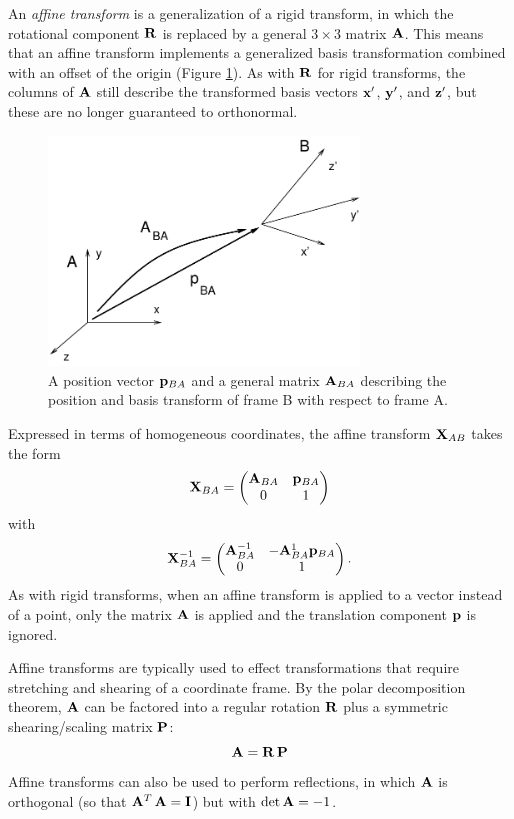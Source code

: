 An {\it affine transform} is a generalization of a rigid transform, in
which the rotational component $\R$ is replaced by a general $3 \times
3$ matrix $\A$. This means that an affine transform implements a
generalized basis transformation combined with an offset of the origin
(Figure \ref{affineAB:fig}). As with $\R$ for rigid transforms, the
columns of $\A$ still describe the transformed basis vectors $\x'$,
$\y'$, and $\z'$, but these are no longer guaranteed to orthonormal.

\begin{figure}[h]
\begin{center}
 \includegraphics[width=3.25in]{images/affineAB}
\end{center}
\caption{A position vector $\p_{BA}$ and a general matrix $\A_{BA}$
describing the position and basis transform of frame B with respect to
frame A.}
\label{affineAB:fig}
\end{figure}

Expressed in terms of homogeneous coordinates,
the affine transform $\X_{AB}$ takes the form
%
\begin{equation}
\X_{BA} = \matl \A_{BA} & \p_{BA} \\ 0 & 1 \matr
\end{equation}
%
with
%
\begin{equation}
\X_{BA}^{-1} = \matl \A_{BA}^{-1} & -\A_{BA}^{\-1} \p_{BA} \\ 0 & 1 \matr.
\end{equation}
%
As with rigid transforms, when an affine transform is applied to a
vector instead of a point, only the matrix $\A$ is applied and the
translation component $\p$ is ignored.

Affine transforms are typically used to effect transformations that
require stretching and shearing of a coordinate frame.  By the polar
decomposition theorem, $\A$ can be factored into a regular
rotation $\R$ plus a symmetric shearing/scaling matrix $\P$:
%
\begin{equation}
\A = \R \, \P
\end{equation}
%
Affine transforms can also be used to perform reflections, in which
$\A$ is orthogonal (so that $\A^T \, \A = \I$) but with $\det \A =
-1$.

